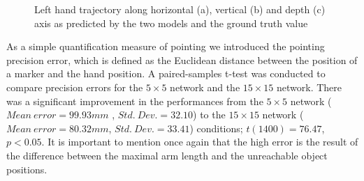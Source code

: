 \begin{figure}[ht!]
\vspace*{-3cm}
\centering
{}
\caption{Left hand trajectory along horizontal (a), vertical (b) and depth (c) axis as predicted by the two models and the ground truth value}
\label{lab:trajectory_x}
\end{figure}


% 
% 

As a simple quantification measure of pointing we introduced the pointing precision error, which is defined as the Euclidean distance between the position of a marker and the hand position. A paired-samples t-test was conducted to compare precision errors for the $5\times 5$ network and the $15 \times 15$ network. There was a significant improvement in the performances from the $5 \times 5$ network ($Mean\ error=99.93mm$
, $Std.\ Dev.=32.10$) to the $15 \times 15$ network ($Mean\ error=80.32mm$, $Std.\ Dev.=33.41$) conditions; $t(1400)=76.47$, $p<0.05$. It is important to mention once again that the high error is the result of the difference between the maximal arm length and the unreachable object positions. 



